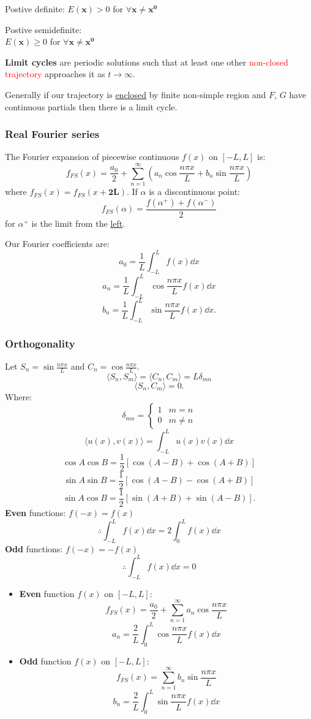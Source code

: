\documentclass{article}
\begin{document}
\begin{multicols}{3}
Postive definite:
$E(\boldsymbol{x})>0$ for
$\forall\boldsymbol{x}\neq\boldsymbol{x^0}$

Postive semidefinite: \\
$E(\boldsymbol{x})\geq0$ for
$\forall\boldsymbol{x}\neq\boldsymbol{x^0}$

\textbf{Limit cycles} are periodic solutions such that 
at least one other \textcolor{red}{non-closed trajectory}
approaches it as $t\rightarrow\infty$.

Generally if our trajectory is \underline{enclosed}
by finite non-simple region and $F$, $G$ have 
continuous partials then there is a limit cycle.

\subsubsection*{Real Fourier series}
The Fourier expansion of piecewise continuous
$f(x)$ on $[-L,L]$ is:
$$f_{FS}(x)=\frac{a_0}{2}+\sum_{n=1}^{\infty}
(a_n \cos\frac{n\pi x}{L}+b_n \sin\frac{n\pi x}{L})$$
where $f_{FS}(x)=f_{FS}(x+\boldsymbol{2L})$.
If $\alpha$ is a discontinuous point:
$$f_{FS}(\alpha)=\frac{f(\alpha^{+})+f(\alpha^{-})}{2}$$
for $\alpha^{+}$ is the limit from the \underline{left}.

Our Fourier coefficients are:
$$a_0=\frac{1}{L}\int_{-L}^{L}f(x)\dd x$$
$$a_n=\frac{1}{L}\int_{-L}^{L}\cos\frac{n\pi x}{L}f(x)\dd x$$
$$b_n=\frac{1}{L}\int_{-L}^{L}\sin\frac{n\pi x}{L}f(x)\dd x.$$

\subsubsection*{Orthogonality}
Let $S_n = \sin\frac{n\pi x}{L}$ and $C_n = \cos\frac{n\pi x}{L}$.
$$\langle S_n, S_m \rangle=\langle C_n, C_m \rangle=L\delta_{mn}$$
$$\langle S_n, C_m \rangle=0.$$
Where:
$$\delta_{mn} =
\left\{
\begin{array}{ll}
	1  & \mbox{} m=n \\
	0 & \mbox{} m\neq n
\end{array}
\right.$$
$$\langle u(x), v(x) \rangle=\int_{-L}^{L} u(x)v(x)\dd x$$
$$\cos A\cos B = \frac{1}{2}[\cos(A-B)+\cos(A+B)]$$
$$\sin A\sin B = \frac{1}{2}[\cos(A-B)-\cos(A+B)]$$
$$\sin A\cos B = \frac{1}{2}[\sin(A+B)+\sin(A-B)].$$
\textbf{Even} functions: $f(-x)=f(x)$
$$\therefore\int_{-L}^{L}f(x)\dd x
=2\int_{0}^{L}f(x)\dd x$$
\textbf{Odd} functions: $f(-x)=-f(x)$
$$\therefore\int_{-L}^{L}f(x)\dd x=0$$

\begin{itemize}
    \item \textbf{Even} function $f(x)$ on $[-L,L]$:
    $$f_{FS}(x)=\frac{a_0}{2}
    +\sum_{n=1}^{\infty}a_n\cos\frac{n\pi x}{L}$$
    $$a_n=\frac{2}{L}\int_{0}^{L}\cos\frac{n\pi x}{L}f(x)\dd x$$
    \item \textbf{Odd} function $f(x)$ on $[-L,L]$:
    $$f_{FS}(x)=\sum_{n=1}^{\infty}b_n\sin\frac{n\pi x}{L}$$
    $$b_n=\frac{2}{L}\int_{0}^{L}\sin\frac{n\pi x}{L}f(x)\dd x$$
\end{itemize}


\end{multicols}
\end{document}
